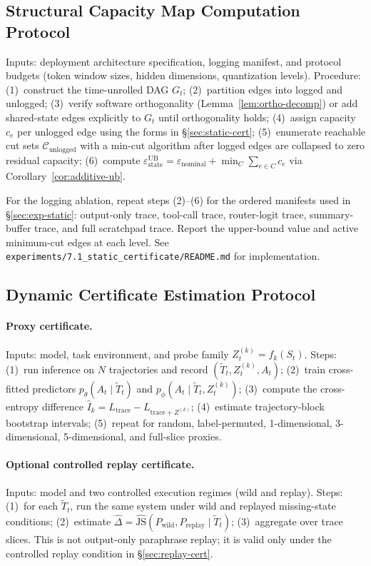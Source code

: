 \documentclass{article}
\begin{document}
  \subsection{Structural Capacity Map Computation Protocol}

  Inputs: deployment architecture specification, logging manifest, and protocol
  budgets (token window sizes, hidden dimensions, quantization levels).
  Procedure: (1)~construct the time-unrolled DAG $G_t$; (2)~partition edges into
   logged and unlogged; (3)~verify software orthogonality
  (Lemma~\ref{lem:ortho-decomp}) or add shared-state edges explicitly to $G_t$
  until orthogonality holds; (4)~assign capacity $c_e$ per unlogged edge using
  the forms in \S\ref{sec:static-cert}; (5)~enumerate reachable cut sets
  $\mathcal{C}_\text{unlogged}$ with a min-cut algorithm after logged edges are
  collapsed to zero residual capacity; (6)~compute
  $\varepsilon_\text{state}^\text{UB} = \varepsilon_\text{nominal} + \min_C
  \sum_{e \in C} c_e$ via Corollary~\ref{cor:additive-ub}.

  For the logging ablation, repeat steps (2)--(6) for the ordered manifests used
   in \S\ref{sec:exp-static}: output-only trace, tool-call trace, router-logit
  trace, summary-buffer trace, and full scratchpad trace. Report the upper-bound
   value and active minimum-cut edges at each level. See
  \texttt{experiments/7.1\_static\_certificate/README.md} for implementation.

  \subsection{Dynamic Certificate Estimation Protocol}

  \paragraph{Proxy certificate.} Inputs: model, task environment, and probe
  family $Z_t^{(k)} = f_k(S_t)$. Steps: (1)~run inference on $N$ trajectories
  and record $(\tilde T_t, Z_t^{(k)}, A_t)$; (2)~train cross-fitted predictors
  $p_\theta(A_t \mid \tilde T_t)$ and $p_\phi(A_t \mid \tilde T_t, Z_t^{(k)})$;
  (3)~compute the cross-entropy difference $\hat I_k = L_\text{trace} -
  L_{\text{trace}+Z^{(k)}}$; (4)~estimate trajectory-block bootstrap intervals;
  (5)~repeat for random, label-permuted, 1-dimensional, 3-dimensional,
  5-dimensional, and full-slice proxies.

  \paragraph{Optional controlled replay certificate.} Inputs: model and two
  controlled execution regimes (wild and replay). Steps: (1)~for each $\tilde
  T_t$, run the same system under wild and replayed missing-state conditions;
  (2)~estimate $\hat\Delta = \hat{\mathrm{JS}}(P_\text{wild}, P_\text{replay}
  \mid \tilde T_t)$; (3)~aggregate over trace slices. This is not output-only
  paraphrase replay; it is valid only under the controlled replay condition in
  \S\ref{sec:replay-cert}.
\end{document}
